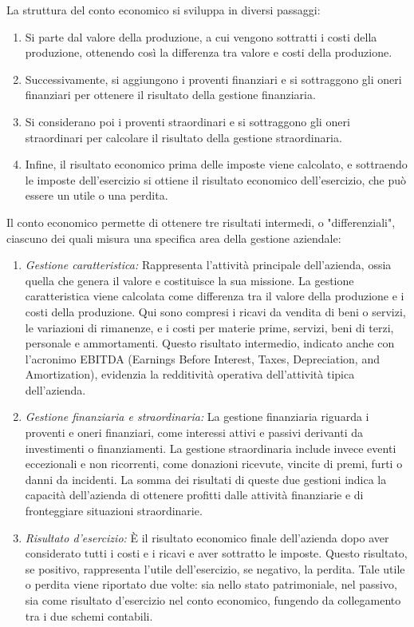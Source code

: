 La struttura del conto economico si sviluppa in diversi passaggi:
\begin{enumerate}
    \item Si parte dal valore della produzione, a cui vengono sottratti i costi della produzione, ottenendo così la differenza tra valore e costi della produzione.
    \item Successivamente, si aggiungono i proventi finanziari e si sottraggono gli oneri finanziari per ottenere il risultato della gestione finanziaria.
    \item Si considerano poi i proventi straordinari e si sottraggono gli oneri straordinari per calcolare il risultato della gestione straordinaria.
    \item Infine, il risultato economico prima delle imposte viene calcolato, e sottraendo le imposte dell’esercizio si ottiene il risultato economico dell’esercizio, che può essere un utile o una perdita.
\end{enumerate}
Il conto economico permette di ottenere tre risultati intermedi, o "differenziali", ciascuno dei quali misura una specifica area della gestione aziendale:
\begin{enumerate}
    \item \textit{Gestione caratteristica:} Rappresenta l’attività principale dell’azienda, ossia quella che genera il valore e costituisce la sua missione. La gestione caratteristica viene calcolata come differenza tra il valore della produzione e i costi della produzione. Qui sono compresi i ricavi da vendita di beni o servizi, le variazioni di rimanenze, e i costi per materie prime, servizi, beni di terzi, personale e ammortamenti. Questo risultato intermedio, indicato anche con l’acronimo EBITDA (Earnings Before Interest, Taxes, Depreciation, and Amortization), evidenzia la redditività operativa dell’attività tipica dell’azienda.
    \item \textit{Gestione finanziaria e straordinaria:} La gestione finanziaria riguarda i proventi e oneri finanziari, come interessi attivi e passivi derivanti da investimenti o finanziamenti. La gestione straordinaria include invece eventi eccezionali e non ricorrenti, come donazioni ricevute, vincite di premi, furti o danni da incidenti. La somma dei risultati di queste due gestioni indica la capacità dell’azienda di ottenere profitti dalle attività finanziarie e di fronteggiare situazioni straordinarie.
    \item \textit{Risultato d’esercizio:} È il risultato economico finale dell’azienda dopo aver considerato tutti i costi e i ricavi e aver sottratto le imposte. Questo risultato, se positivo, rappresenta l’utile dell’esercizio, se negativo, la perdita. Tale utile o perdita viene riportato due volte: sia nello stato patrimoniale, nel passivo, sia come risultato d’esercizio nel conto economico, fungendo da collegamento tra i due schemi contabili.
\end{enumerate}

